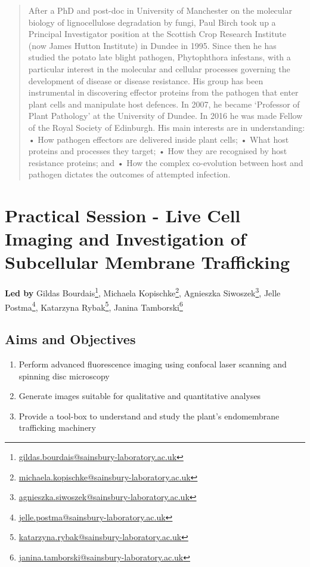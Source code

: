 \documentclass[12pt,]{book}
\providecommand{\tightlist}{%
  \setlength{\itemsep}{0pt}\setlength{\parskip}{0pt}}
\let\rmarkdownfootnote\footnote%
\def\footnote{\protect\rmarkdownfootnote}
\renewcommand{\href}[2]{#2\footnote{\url{#1}}}
\theoremstyle{definition}
\theoremstyle{definition}
\theoremstyle{remark}
\begin{document}
\begin{quote}
After a PhD and post-doc in University of Manchester on the molecular
biology of lignocellulose degradation by fungi, Paul Birch took up a
Principal Investigator position at the Scottish Crop Research Institute
(now James Hutton Institute) in Dundee in 1995. Since then he has
studied the potato late blight pathogen, Phytophthora infestans, with a
particular interest in the molecular and cellular processes governing
the development of disease or disease resistance. His group has been
instrumental in discovering effector proteins from the pathogen that
enter plant cells and manipulate host defences. In 2007, he became
`Professor of Plant Pathology' at the University of Dundee. In 2016 he
was made Fellow of the Royal Society of Edinburgh. His main interests
are in understanding: • How pathogen effectors are delivered inside
plant cells; • What host proteins and processes they target; • How they
are recognised by host resistance proteins; and • How the complex
co-evolution between host and pathogen dictates the outcomes of
attempted infection.
\end{quote}

\newpage

\section*{Practical Session - Live Cell Imaging and Investigation of
Subcellular Membrane
Trafficking}\label{practical-session---live-cell-imaging-and-investigation-of-subcellular-membrane-trafficking}

\textbf{Led by} \href{gildas.bourdais@sainsbury-laboratory.ac.uk}{Gildas
Bourdais}, \href{michaela.kopischke@sainsbury-laboratory.ac.uk}{Michaela
Kopischke},
\href{agnieszka.siwoszek@sainsbury-laboratory.ac.uk}{Agnieszka
Siwoszek}, \href{jelle.postma@sainsbury-laboratory.ac.uk}{Jelle Postma},
\href{katarzyna.rybak@sainsbury-laboratory.ac.uk}{Katarzyna Rybak},
\href{janina.tamborski@sainsbury-laboratory.ac.uk}{Janina Tamborski}

\subsection*{Aims and Objectives}\label{aims-and-objectives-4}

\begin{enumerate}
\def\labelenumi{\arabic{enumi}.}
\tightlist
\item
  Perform advanced fluorescence imaging using confocal laser scanning
  and spinning disc microscopy
\item
  Generate images suitable for qualitative and quantitative analyses
\item
  Provide a tool-box to understand and study the plant's endomembrane
  trafficking machinery
\end{enumerate}
\end{document}
